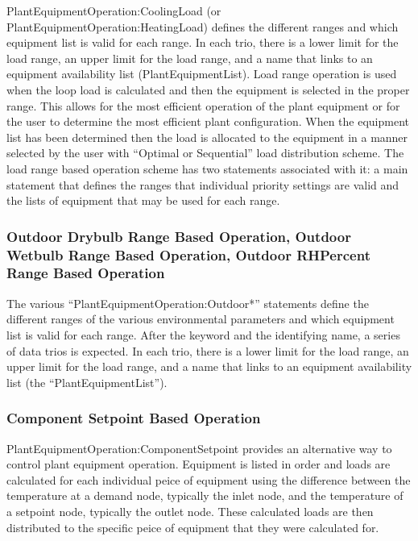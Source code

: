 PlantEquipmentOperation:CoolingLoad (or PlantEquipmentOperation:HeatingLoad) defines the different ranges and which equipment list is valid for each range. In each trio, there is a lower limit for the load range, an upper limit for the load range, and a name that links to an equipment availability list (PlantEquipmentList). Load range operation is used when the loop load is calculated and then the equipment is selected in the proper range. This allows for the most efficient operation of the plant equipment or for the user to determine the most efficient plant configuration. When the equipment list has been determined then the load is allocated to the equipment in a manner selected by the user with ``Optimal or Sequential'' load distribution scheme. The load range based operation scheme has two statements associated with it: a main statement that defines the ranges that individual priority settings are valid and the lists of equipment that may be used for each range.

\subsubsection{Outdoor Drybulb Range Based Operation, Outdoor Wetbulb Range Based Operation, Outdoor RHPercent Range Based Operation}\label{outdoor-drybulb-range-based-operation-outdoor-wetbulb-range-based-operation-outdoor-rhpercent-range-based-operation}

The various ``PlantEquipmentOperation:Outdoor*'' statements define the different ranges of the various environmental parameters and which equipment list is valid for each range. After the keyword and the identifying name, a series of data trios is expected. In each trio, there is a lower limit for the load range, an upper limit for the load range, and a name that links to an equipment availability list (the ``PlantEquipmentList'').

\subsubsection{Component Setpoint Based Operation}\label{component-setpoint-based-operation}

PlantEquipmentOperation:ComponentSetpoint provides an alternative way to control plant equipment operation.  Equipment is listed in order and loads are calculated for each individual peice of equipment using the difference between the temperature at a demand node, typically the inlet node, and the temperature of a setpoint node, typically the outlet node. These calculated loads are then distributed to the specific peice of equipment that they were calculated for.

